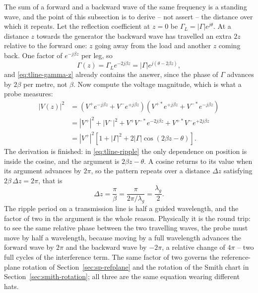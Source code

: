 The sum of a forward and a backward wave of the same frequency is a standing wave, and the point of this
subsection is to derive -- not assert -- the distance over which it repeats. Let the reflection coefficient at
$z=0$ be $\Gamma_L=|\Gamma|e^{j\theta}$. At a distance $z$ towards the generator the backward wave has travelled
an extra $2z$ relative to the forward one: $z$ going away from the load and another $z$ coming back. One
factor of $e^{-j\beta z}$ per leg, so
\begin{equation}
  \Gamma(z) = \Gamma_L e^{-2j\beta z} = |\Gamma| e^{j(\theta - 2\beta z)} ,
  \label{eq:tline-gamma-z}
\end{equation}
and \eqref{eq:tline-gamma-z} already contains the answer, since the phase of $\Gamma$ advances by $2\beta$ per
metre, not $\beta$. Now compute the voltage magnitude, which is what a probe measures:
\begin{align}
  |V(z)|^2 &= \left(V^{+} e^{-j\beta z} + V^{-} e^{+j\beta z}\right)
              \left(V^{+*} e^{+j\beta z} + V^{-*} e^{-j\beta z}\right) \nonumber\\
           &= |V^{+}|^2 + |V^{-}|^2 + V^{+}V^{-*} e^{-2j\beta z} + V^{+*}V^{-} e^{+2j\beta z} \nonumber\\
           &= |V^{+}|^2\left[1 + |\Gamma|^2 + 2|\Gamma|\cos\!\left(2\beta z - \theta\right)\right].
  \label{eq:tline-ripple}
\end{align}
The derivation is finished: in \eqref{eq:tline-ripple} the only dependence on position is inside the cosine,
and the argument is $2\beta z-\theta$. A cosine returns to its value when its argument advances by $2\pi$, so
the pattern repeats over a distance $\Delta z$ satisfying $2\beta\,\Delta z = 2\pi$, that is
\begin{equation}
  \Delta z = \frac{\pi}{\beta} = \frac{\pi}{2\pi/\lambda_g} = \frac{\lambda_g}{2} .
  \label{eq:tline-ripple-period}
\end{equation}
The ripple period on a transmission line is half a guided wavelength, and the factor of two in the argument is
the whole reason. Physically it is the round trip: to see the same relative phase between the two travelling
waves, the probe must move by half a wavelength, because moving by a full wavelength advances the forward wave
by $2\pi$ and the backward wave by $-2\pi$, a relative change of $4\pi$ -- two full cycles of the interference
term. The same factor of two governs the reference-plane rotation of Section~\ref{sec:sp-refplane} and the
rotation of the Smith chart in Section~\ref{sec:smith-rotation}; all three are the same equation wearing
different hats.

